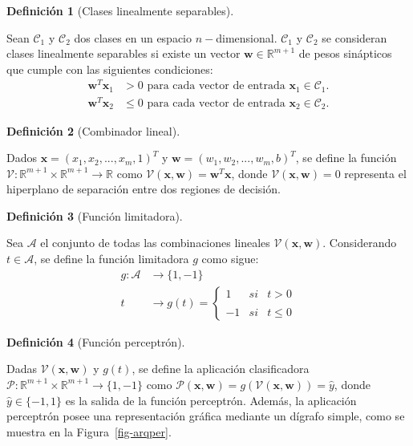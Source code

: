 \documentclass[
  us-letterpaper,
]{scrreprt}
\theoremstyle{definition}
\theoremstyle{plain}
\theoremstyle{plain}
\theoremstyle{definition}
\newtheorem{definition}{Definición}[chapter]
\theoremstyle{remark}
\begin{document}
\begin{definition}[Clases linealmente
separables]\protect\hypertarget{def-cls}{}\label{def-cls}

Sean \(\mathscr C_1\) y \(\mathscr C_2\) dos clases en un espacio
\(n-\)dimensional. \(\mathscr C_1\) y \(\mathscr C_2\) se consideran
clases linealmente separables si existe un vector
\(\mathbf w \in \mathbb R^{m+1}\) de pesos sinápticos que cumple con las
siguientes condiciones: \[
\begin{split}
\mathbf w^T \mathbf x_1 &> 0\text{ para cada vector de entrada } \mathbf x_1 \in \mathscr C_1.\\
\mathbf w^T \mathbf x_2 &\leq 0\text{ para cada vector de entrada } \mathbf x_2 \in \mathscr C_2.
\end{split}
\]

\end{definition}

\begin{definition}[Combinador
lineal]\protect\hypertarget{def-comlin}{}\label{def-comlin}

Dados \(\mathbf x = (x_1, x_2,..., x_m,1)^T\) y
\(\mathbf w = (w_1,w_2,...,w_m,b)^T\), se define la función
\(\mathcal V: \mathbb R^{m+1}\times\mathbb R^{m+1} \rightarrow \mathbb R\)
como \(\mathcal V(\mathbf x, \mathbf w) = \mathbf w^T\mathbf x\), donde
\(\mathcal V(\mathbf x, \mathbf w) = 0\) representa el hiperplano de
separación entre dos regiones de decisión.

\end{definition}

\begin{definition}[Función
limitadora]\protect\hypertarget{def-flim}{}\label{def-flim}

Sea \(\mathscr A\) el conjunto de todas las combinaciones lineales
\(\mathcal V(\mathbf x, \mathbf w)\). Considerando \(t \in \mathscr A\),
se define la función limitadora \(g\) como sigue: \[
\begin{split}
g: \mathscr A&\rightarrow \{1,-1\}\\
t &\rightarrow g(t)= \left\{\begin{array}{lcc} 1 & si & t> 0\\ \\-1 & si & t\leq 0\end{array}\right.
\end{split}
\]

\end{definition}

\begin{definition}[Función
perceptrón]\protect\hypertarget{def-fper}{}\label{def-fper}

Dadas \(\mathcal V(\mathbf x, \mathbf w)\) y \(g(t)\), se define la
aplicación clasificadora
\(\mathscr P: \mathbb R^{m+1}\times \mathbb R^{m+1} \rightarrow \{1,-1\}\)
como
\(\mathscr P(\mathbf x, \mathbf w)=g(\mathcal V(\mathbf x, \mathbf w))=\hat{y}\),
donde \(\hat{y}\in \{-1,1\}\) es la salida de la función perceptrón.
Además, la aplicación perceptrón posee una representación gráfica
mediante un dígrafo simple, como se muestra en la
Figura~\ref{fig-arqper}.

\end{definition}
\end{document}
